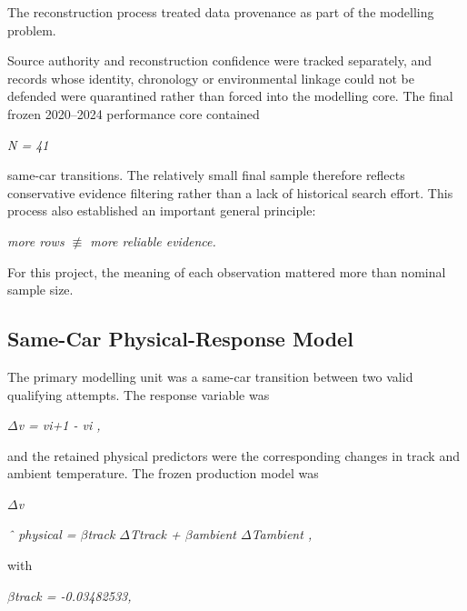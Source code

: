 The reconstruction process treated data provenance as part of the modelling problem.

Source authority and reconstruction confidence were tracked separately, and records whose identity, chronology or environmental linkage could not be defended were quarantined rather than forced into the modelling core. The final frozen 2020--2024 performance core contained

\begin{center}\textit{N = 41}\end{center}

same-car transitions. The relatively small final sample therefore reflects conservative evidence filtering rather than a lack of historical search effort. This process also established an important general principle:

\begin{center}\textit{more rows \ensuremath{\not\equiv} more reliable evidence.}\end{center}

For this project, the meaning of each observation mattered more than nominal sample size.

\subsection{Same-Car Physical-Response Model}
The primary modelling unit was a same-car transition between two valid qualifying attempts. The response variable was

\begin{center}\textit{\ensuremath{\Delta}v = vi+1 - vi ,}\end{center}

and the retained physical predictors were the corresponding changes in track and ambient temperature. The frozen production model was

\begin{center}\textit{\ensuremath{\Delta}v}\end{center}

\begin{center}\textit{ˆ physical = \ensuremath{\beta}track \ensuremath{\Delta}Ttrack + \ensuremath{\beta}ambient \ensuremath{\Delta}Tambient ,}\end{center}

with

\begin{center}\textit{\ensuremath{\beta}track = -0.03482533,}\end{center}

